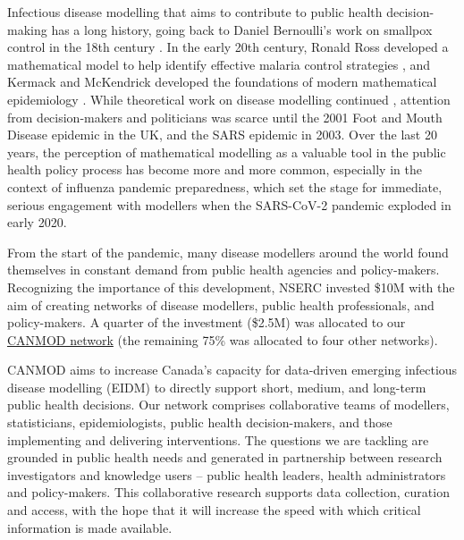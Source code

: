 
Infectious disease modelling that aims to contribute to public health
decision-making has a long history, going back to Daniel Bernoulli’s
work on smallpox control in the 18th century \cite{Bern1760}.  In the
early 20th century, Ronald Ross developed a mathematical model to help
identify effective malaria control strategies \cite{Ross11}, and
Kermack and McKendrick developed the foundations of modern
mathematical epidemiology \cite{KermMcKe27}.  While theoretical work
on disease modelling continued \cite{Bart57,Bail75,AndeMay91},
attention from decision-makers and politicians was scarce until the
2001 Foot and Mouth Disease epidemic in the UK, and the SARS epidemic
in 2003.  Over the last 20 years, the perception of mathematical
modelling as a valuable tool in the public health policy process has
become more and more common, especially in the context of influenza
pandemic preparedness, which set the stage for immediate, serious
engagement with modellers when the SARS-CoV-2 pandemic exploded in
early 2020.

From the start of the pandemic, many disease modellers around the
world found themselves in constant demand from public health agencies
and policy-makers.  Recognizing the importance of this development,
NSERC invested \$10M with the aim of creating networks of disease
modellers, public health professionals, and policy-makers.  A quarter of
the investment (\$2.5M) was allocated to our
\href{https://canmod.net/}{CANMOD network} (the remaining 75\% was
allocated to four other networks).

CANMOD aims to increase Canada’s capacity for data-driven emerging
infectious disease modelling (EIDM) to directly support short, medium,
and long-term public health decisions. Our network comprises
collaborative teams of modellers, statisticians, epidemiologists,
public health decision-makers, and those implementing and delivering
interventions. The questions we are tackling are grounded in public
health needs and generated in partnership between research
investigators and knowledge users -- public health leaders, health
administrators and policy-makers. This collaborative research supports
data collection, curation and access, with the hope that it will
increase the speed with which critical information is made available.


